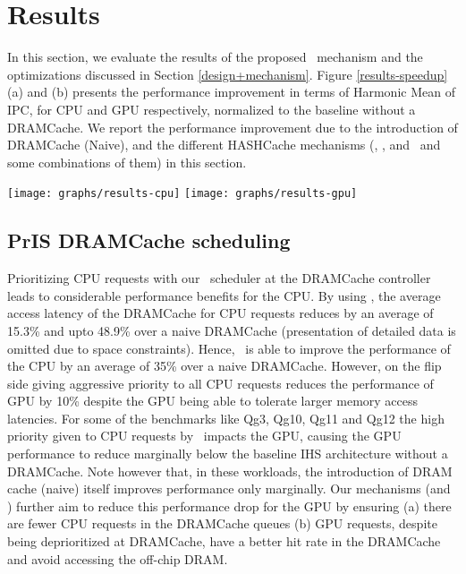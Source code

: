 \section{Results} \label{results}
In this section, we evaluate the results of the proposed \cachename\ mechanism and the optimizations discussed in Section \ref{design+mechanism}. Figure \ref{results-speedup} (a) and (b) presents the performance improvement in terms of Harmonic Mean of IPC, for CPU and GPU respectively, normalized to the baseline without a DRAMCache. We report the performance improvement due to the introduction of DRAMCache (Naive),  and the different HASHCache mechanisms (\prioname, \bypassname, and \chaining\ and some combinations of them) in this section. 

\begin{figure*}[htb]
	\centering
	\texttt{[image: graphs/results-cpu]}
	\texttt{[image: graphs/results-gpu]}
	\caption{Speedups obtained by adding a stacked DRAMCache for (a) CPU (b) GPU}
	\label{results-speedup}
\end{figure*}

\subsection{PrIS DRAMCache scheduling}
Prioritizing CPU requests with our \prioname\ scheduler at the DRAMCache controller leads to considerable performance benefits for the CPU. By using \prioname, the average access latency of the DRAMCache for CPU requests reduces by an average of 15.3\% and upto 48.9\% over a naive DRAMCache (presentation of detailed data is omitted due to space constraints). Hence, \prioname\ is able to improve the performance of the CPU by an average of 35\% over a naive DRAMCache. However, on the flip side giving aggressive priority to all CPU requests reduces the performance of GPU by 10\% despite the GPU being able to tolerate larger memory access latencies. For some of the benchmarks like Qg3, Qg10, Qg11 and Qg12 the high priority given to CPU requests by \prioname\ impacts the GPU, causing the GPU performance to reduce marginally below the baseline IHS architecture without a DRAMCache. Note however that, in these workloads, the introduction of DRAM cache (naive) itself improves performance only marginally. Our mechanisms (\bypassname and \chaining) further aim to reduce this performance drop for the GPU by ensuring (a) there are fewer CPU requests in the DRAMCache queues (b) GPU requests, despite being deprioritized at DRAMCache, have a better hit rate in the DRAMCache and avoid accessing the off-chip DRAM.
